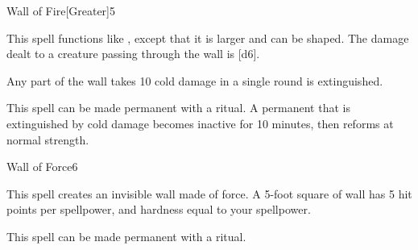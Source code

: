 \begin{spellsection}{Wall of Fire}[Greater]{5}
    \begin{spellheader}
    \end{spellheader}
    \begin{spellcontent}
        \begin{spelltargetinginfo}
        \end{spelltargetinginfo}
        \begin{spelleffects}
            \spellspecial This spell functions like , except that it is larger and can be shaped. The damage dealt to a creature passing through the wall is [d6].
            \spelldur \durshort
        \end{spelleffects}
    \end{spellcontent}
    \begin{spellfooter}
        \spellnotes Any part of the wall takes 10 cold damage in a single round is extinguished.

        This spell can be made permanent with a  ritual. A permanent  that is extinguished by cold damage becomes inactive for 10 minutes, then reforms at normal strength.
        \miscastexplode
    \end{spellfooter}
\end{spellsection}

\begin{spellsection}{Wall of Force}{6}
    \begin{spellheader}
    \end{spellheader}
    \begin{spellcontent}
        \begin{spelltargetinginfo}
        \end{spelltargetinginfo}
        \begin{spelleffects}
            \spelleffect This spell creates an invisible wall made of force. A 5-foot square of wall has 5 hit points per spellpower, and hardness equal to your spellpower.
            \spelldur \durshort \dismissable
        \end{spelleffects}
    \end{spellcontent}
    \begin{spellfooter}
        \spellnotes \forcespellnotes

        This spell can be made permanent with a  ritual.
        \miscastexplode
    \end{spellfooter}
\end{spellsection}

